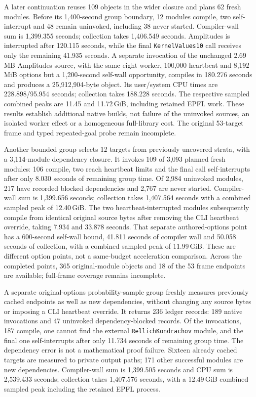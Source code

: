 \documentclass[10pt,twocolumn]{article}
\begin{document}
A later continuation reuses 109 objects in the wider closure and plans
62 fresh modules. Before its 1,400-second group boundary, 12 modules compile,
two self-interrupt and 48 remain uninvoked, including 38 never started.
Compiler-wall sum is 1,399.355 seconds; collection takes 1,406.549 seconds.
Amplitudes is interrupted after 120.115 seconds, while the final
\texttt{KernelValues10} call receives only the remaining 41.935 seconds.
A separate invocation of the unchanged 2.69\,MB Amplitudes source, with
the same eight-worker, 100,000-heartbeat and 8,192\,MiB options but a
1,200-second self-wall opportunity, compiles in 180.276 seconds and produces
a 25,912,904-byte object. Its user/system CPU times are 228.898/95.954 seconds;
collection takes 188.228 seconds. The respective sampled combined peaks
are 11.45 and 11.72\,GiB, including retained EPFL work.
These results establish additional native builds, not failure of the
uninvoked sources, an isolated worker effect or a homogeneous full-library cost.
The original 53-target frame and typed repeated-goal probe remain incomplete.

Another bounded group selects 12 targets from previously uncovered strata,
with a 3,114-module dependency closure. It invokes 109 of 3,093 planned
fresh modules: 106 compile, two reach heartbeat limits and the final call
self-interrupts after only 8.030 seconds of remaining group time.
Of 2,984 uninvoked modules, 217 have recorded blocked dependencies and
2,767 are never started. Compiler-wall sum is 1,399.656 seconds; collection
takes 1,407.564 seconds with a combined sampled peak of 12.40\,GiB.
The two heartbeat-interrupted modules subsequently compile from identical
original source bytes after removing the CLI heartbeat override, taking
7.934 and 33.878 seconds. That separate authored-options point has a
600-second self-wall bound, 41.811 seconds of compiler wall and 50.058
seconds of collection, with a combined sampled peak of 11.99\,GiB.
These are different option points, not a same-budget acceleration comparison.
Across the completed points, 365 original-module objects and 18 of the
53 frame endpoints are available; full-frame coverage remains incomplete.

A separate original-options probability-sample group freshly measures
previously cached endpoints as well as new dependencies, without changing
any source bytes or imposing a CLI heartbeat override. It returns 236 ledger
records: 189 native invocations and 47 uninvoked dependency-blocked records.
Of the invocations, 187 compile, one cannot find the external
\texttt{RellichKondrachov} module, and the final one self-interrupts after
only 11.734 seconds of remaining group time. The dependency error is not
a mathematical proof failure. Sixteen already cached targets are measured
to private output paths; 171 other successful modules are new dependencies.
Compiler-wall sum is 1,399.505 seconds and CPU sum is 2,539.433 seconds;
collection takes 1,407.576 seconds, with a 12.49\,GiB combined sampled peak
including the retained EPFL process.
\end{document}
